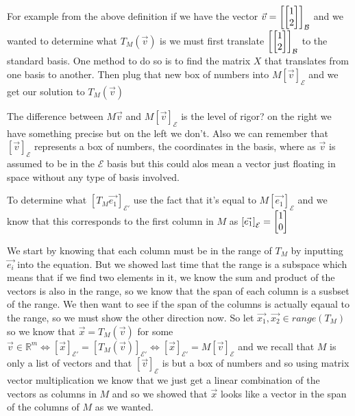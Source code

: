 \documentclass[11pt]{book}
\begin{document}
\begin{eg}
    For example from the above definition if we have the vector $\vec{v} = \left[ \begin{bmatrix} 1 \\ 2 \end{bmatrix} \right]_{\mathcal{B}}$ and we wanted to determine what $T_{M}\left(\vec{v}\right)$ is we must first translate $\left[ \begin{bmatrix} 1 \\ 2 \end{bmatrix} \right]_{\mathcal{B}}$ to the standard basis. One method to do so is to find the matrix $X$ that translates from one basis to another. Then plug that new box of numbers into $M \left[ \vec{v} \right]_{\mathcal{E}}$ and we get our solution to $T_{M}\left(\vec{v}\right)$ 
\end{eg}

\begin{eg}
    The difference between $M\vec{v}$ and $M \left[ \vec{v} \right]_{\mathcal{E}}$ is the level of rigor? on the right we have something precise but on the left we don't. Also we can remember that $\left[ \vec{v} \right]_{\mathcal{E}}$ represents a box of numbers, the coordinates in the basis, where as $\vec{v}$ is assumed to be in the $\mathcal{E}$ basis but this could alos mean a vector just floating in space without any type of basis involved.
\end{eg}

\begin{eg}
    To determine what $\left[ T_{M}\vec{e_1} \right]_{\mathcal{E'}}$ use the fact that it's equal to $M\left[ \vec{e_1} \right]_{\mathcal{E}}$ and we know that this corresponds to the first column in $M$ as $\left[ \vec{e_1} \right]_{\mathcal{E}} = \begin{bmatrix} 1 \\ 0 \end{bmatrix}$ 
\end{eg}

\begin{eg}
    We start by knowing that each column must be in the range of $T_{M}$ by inputting $\vec{e_i}$ into the equation. But we showed last time that the range is a subspace which means that if we find two elements in it, we know the sum and product of the vectors is also in the range, so we know that the span of each column is a susbset of the range. %
    We then want to see if the span of the columns is actually eqaual to the range, so we must show the other direction now. So let $\vec{x_{1}}, \vec{x_2} \in \mathit{range} {\left( T_{M} \right)} $ so we know that $\vec{x} = T_{M}\left(\vec{v}\right)$ for some $\vec{v} \in \mathbb{R}^{m} \Leftrightarrow \left[ \vec{x} \right]_{\mathcal{E'}} = \left[ T_{M}\left(\vec{v}\right) \right]_{\mathcal{E'}} \Leftrightarrow \left[ \vec{x} \right]_{\mathcal{E'}} = M \left[ \vec{v} \right]_{\mathcal{E}}$ and we recall that $M$ is only a list of vectors and that $\left[ \vec{v} \right]_{\mathcal{E}}$ is but a box of numbers and so using matrix vector multiplication we know that we just get a linear combination of the vectors as columns in $M$ and so we showed that $\vec{x}$ looks like a vector in the span of the columns of $M$ as we wanted.
\end{eg}
\end{document}
